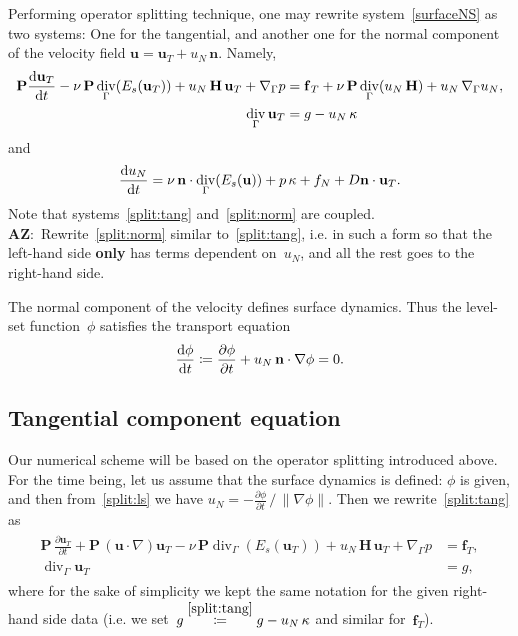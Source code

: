 \documentclass[12pt]{article}
\newcommand{\vect}[1]{\boldsymbol{\mathbf{#1}}}
\DeclareMathOperator{\Div}{div}
\newcommand{\AZ}[1]{{\color{red}\textbf{AZ}:~#1}}
\begin{document}
Performing operator splitting technique, one may rewrite system~\eqref{surfaceNS} as two systems: One for the tangential, and another one for the normal component of the velocity field $\vect u = \vect u_T + u_N\,\vect n$. Namely,
\begin{align}\begin{split}\label{split:tang}
	\vect P \frac{\mbox d\vect u_T}{\mbox d t} - \nu\,\vect P\Div_\Gamma(E_s(\vect u_T)) + u_N\,\vect H\,\vect u_T + \nabla_\Gamma p &= \vect f_T + \nu\,\vect P \Div_\Gamma(u_N\,\vect H) + u_N\,\nabla_\Gamma u_N,\\
	\Div_\Gamma \vect u_T &= g - u_N\,\kappa
\end{split}\end{align}
and 
\begin{equation}\label{split:norm}
	\frac{\mbox d u_N}{\mbox d t} = \nu\,\vect n\cdot\Div_\Gamma(E_s(\vect u)) + p\,\kappa + f_N + D \vect n\cdot\vect u_T. 	
\end{equation}
Note that systems~\eqref{split:tang} and~\eqref{split:norm} are coupled. \AZ{Rewrite~\eqref{split:norm} similar to~\eqref{split:tang}, i.e. in such a form so that the left-hand side \textbf{only} has terms dependent on~$u_N$, and all the rest goes to the right-hand side.}

The normal component of the velocity defines surface dynamics. Thus the level-set function~$\phi$ satisfies the transport equation
\begin{equation}\label{split:ls}
	\frac{\mbox d\phi}{\mbox d t} \coloneqq \frac{\partial \phi}{\partial t} + u_N\,\vect n\cdot\nabla\phi = 0.
\end{equation} 

\subsection{Tangential component equation}

Our numerical scheme will be based on the operator splitting introduced above. For the time being, let us assume that the surface dynamics is defined: $\phi$ is given, and then from~\eqref{split:ls} we have $u_N = -\frac{\partial \phi}{\partial t}\,/\,\|\nabla \phi\|$. Then we rewrite~\eqref{split:tang} as
\begin{align}\begin{split}\label{split:tang2}
	\vect P\,\frac{\partial\vect u_T}{\partial t} + \vect P\,(\vect u\cdot\nabla)\vect u_T - \nu\,\vect P\Div_\Gamma(E_s(\vect u_T)) + u_N\,\vect H\,\vect u_T + \nabla_\Gamma p &= \vect f_T,\\
	\Div_\Gamma \vect u_T &= g,
\end{split}\end{align}
where for the sake of simplicity we kept the same notation for the given right-hand side data (i.e. we set~$g \stackrel{\eqref{split:tang}}{\coloneqq} g - u_N\,\kappa$ and similar for~$\vect f_T$).
\end{document}
